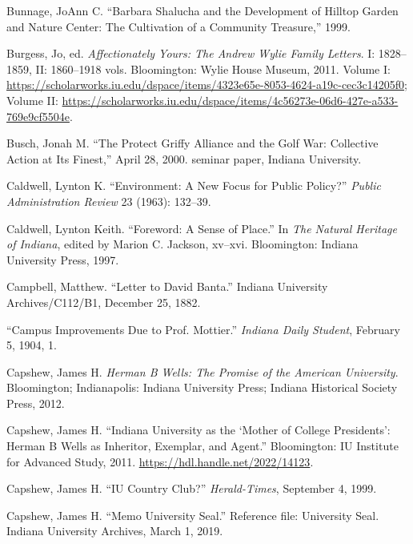\documentclass[
  american,
  letterpaper,
]{scrreprt}
\newlength{\cslhangindent}
\newenvironment{CSLReferences}[2] %
 {\begin{list}{}{%
  \setlength{\itemindent}{0pt}
  \setlength{\leftmargin}{0pt}
  \setlength{\parsep}{0pt}
  \ifodd #1
   \setlength{\leftmargin}{\cslhangindent}
   \setlength{\itemindent}{-1\cslhangindent}
  \fi
  \setlength{\itemsep}{#2\baselineskip}}}
 {\end{list}}
\begin{document}
\begin{CSLReferences}{1}{0}
Bunnage, JoAnn C. {``Barbara Shalucha and the Development of Hilltop
Garden and Nature Center: The Cultivation of a Community Treasure,''}
1999.

Burgess, Jo, ed. \emph{Affectionately Yours: The Andrew Wylie Family
Letters}. I: 1828--1859, II: 1860--1918 vols. Bloomington: Wylie House
Museum, 2011. Volume I:
\url{https://scholarworks.iu.edu/dspace/items/4323e65e-8053-4624-a19c-cec3c14205f0};
Volume II:
\url{https://scholarworks.iu.edu/dspace/items/4c56273e-06d6-427e-a533-769e9cf5504e}.

Busch, Jonah M. {``The Protect Griffy Alliance and the Golf War:
Collective Action at Its Finest,''} April 28, 2000. seminar paper,
Indiana University.

Caldwell, Lynton K. {``Environment: A New Focus for Public Policy?''}
\emph{Public Administration Review} 23 (1963): 132--39.

Caldwell, Lynton Keith. {``Foreword: A Sense of Place.''} In \emph{The
Natural Heritage of Indiana}, edited by Marion C. Jackson, xv--xvi.
Bloomington: Indiana University Press, 1997.

Campbell, Matthew. {``Letter to David Banta.''} Indiana University
Archives/C112/B1, December 25, 1882.

{``Campus Improvements Due to Prof. Mottier.''} \emph{Indiana Daily
Student}, February 5, 1904, 1.

Capshew, James H. \emph{Herman {B} Wells: The Promise of the American
University}. Bloomington; Indianapolis: Indiana University Press;
Indiana Historical Society Press, 2012.

Capshew, James H. {``Indiana University as the {`Mother of College
Presidents'}: Herman {B} Wells as Inheritor, Exemplar, and Agent.''}
Bloomington: IU Institute for Advanced Study, 2011.
\url{https://hdl.handle.net/2022/14123}.

Capshew, James H. {``IU Country Club?''} \emph{Herald-Times}, September
4, 1999.

Capshew, James H. {``Memo University Seal.''} Reference file: University
Seal. Indiana University Archives, March 1, 2019.


\end{CSLReferences}
\end{document}
